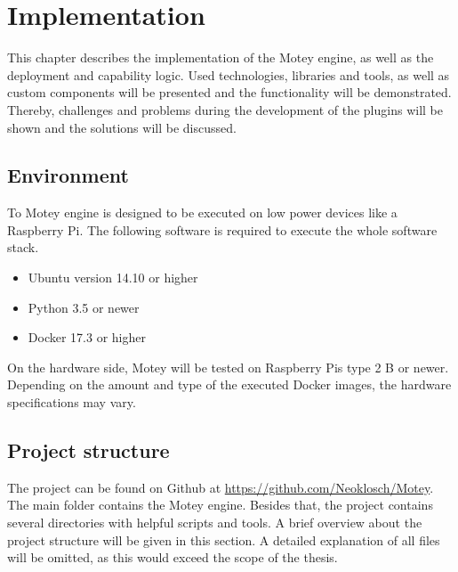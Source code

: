 \chapter{Implementation}
\label{chapter:implementation}
\minitoc\vspace{.5cm}
This chapter describes the implementation of the Motey engine, as well as the deployment and capability logic.
Used technologies, libraries and tools, as well as custom components will be presented and the functionality will be demonstrated.
Thereby, challenges and problems during the development of the plugins will be shown and the solutions will be discussed.

\section{Environment}
To Motey engine is designed to be executed on low power devices like a Raspberry Pi.
The following software is required to execute the whole software stack.
\begin{itemize}
  \item Ubuntu version 14.10 or higher
  \item Python 3.5 or newer
  \item Docker 17.3 or higher
\end{itemize}
On the hardware side, Motey will be tested on Raspberry Pis type 2 B or newer.
Depending on the amount and type of the executed Docker images, the hardware specifications may vary.


\section{Project structure}
The project can be found on Github at \url{https://github.com/Neoklosch/Motey}.
The main folder contains the Motey engine.
Besides that, the project contains several directories with helpful scripts and tools.
A brief overview about the project structure will be given in this section.
A detailed explanation of all files will be omitted, as this would exceed the scope of the thesis.

